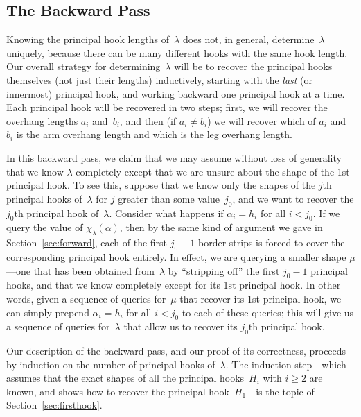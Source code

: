 \documentclass[12pt]{article}
\theoremstyle{definition}
\begin{document}
\subsection{The Backward Pass}
\label{sec:backward}


Knowing the principal hook lengths of~$\lambda$ does not, in general,
determine~$\lambda$ uniquely, because there can be many
different hooks with the same hook length.
Our overall strategy for determining~$\lambda$
will be to recover the principal hooks themselves (not just their lengths)
inductively, starting with the \emph{last} (or innermost) principal hook,
and working backward one principal hook at a time.
Each principal hook will be recovered in two steps;
first, we will recover the overhang lengths $a_i$ and~$b_i$,
and then (if $a_i \ne b_i$) we will recover which of $a_i$ and~$b_i$ is
the arm overhang length and which is the leg overhang length.


In this backward pass,
we claim that we may assume without loss of generality that
we know $\lambda$ completely except that we are unsure about
the shape of the 1st principal hook.
To see this, suppose that we know only the shapes of
the $j$th principal hooks of~$\lambda$
for $j$ greater than some value~$j_0$,
and we want to recover the $j_0$th principal hook of~$\lambda$.
Consider what happens if $\alpha_i = h_i$ for all $i<j_0$.
If we query the value of $\chi_\lambda(\alpha)$,
then by the same kind of argument we gave in
Section~\ref{sec:forward},
each of the first $j_0-1$ border strips is forced to cover
the corresponding principal hook entirely.
In effect, we are querying a smaller shape $\mu$---one that has been
obtained from~$\lambda$ by ``stripping off'' the first $j_0-1$ principal hooks,
and that we know completely except for its 1st principal hook.
In other words, given a sequence of queries for~$\mu$
that recover its 1st principal hook, we can simply prepend
$\alpha_i = h_i$ for all $i<j_0$ to each of these queries;
this will give us a sequence of queries for~$\lambda$
that allow us  to recover its $j_0$th principal hook.

Our description of the backward pass,
and our proof of its correctness,
proceeds by induction on the number of principal
hooks of~$\lambda$.
The induction step---which assumes that
the exact shapes of all the principal hooks~$H_i$
with $i\ge 2$ are known,
and shows how to recover the principal hook~$H_1$---is
the topic of Section~\ref{sec:firsthook}.
\end{document}
